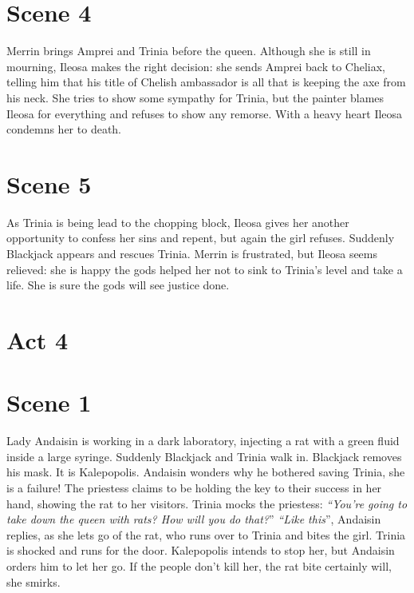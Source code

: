 \section{Scene 4}

Merrin brings Amprei and Trinia before the queen. Although she is still in mourning, Ileosa makes the right decision: she sends Amprei back to Cheliax, telling him that his title of Chelish ambassador is all that is keeping the axe from his neck. She tries to show some sympathy for Trinia, but the painter blames Ileosa for everything and refuses to show any remorse. With a heavy heart Ileosa condemns her to death.\\

\section{Scene 5}

As Trinia is being lead to the chopping block, Ileosa gives her another opportunity to confess her sins and repent, but again the girl refuses. Suddenly Blackjack appears and rescues Trinia. Merrin is frustrated, but Ileosa seems relieved: she is happy the gods helped her not to sink to Trinia's level and take a life. She is sure the gods will see justice done.\\

\section{Act 4}

\section{Scene 1}

Lady Andaisin is working in a dark laboratory, injecting a rat with a green fluid inside a large syringe. Suddenly Blackjack and Trinia walk in. Blackjack removes his mask. It is Kalepopolis. Andaisin wonders why he bothered saving Trinia, she is a failure! The priestess claims to be holding the key to their success in her hand, showing the rat to her visitors. Trinia mocks the priestess: {\itshape``You're going to take down the queen with rats? How will you do that?}'' {\itshape``Like this}'', Andaisin replies, as she lets go of the rat, who runs over to Trinia and bites the girl. Trinia is shocked and runs for the door. Kalepopolis intends to stop her, but Andaisin orders him to let her go. If the people don't kill her, the rat bite certainly will, she smirks.\\

